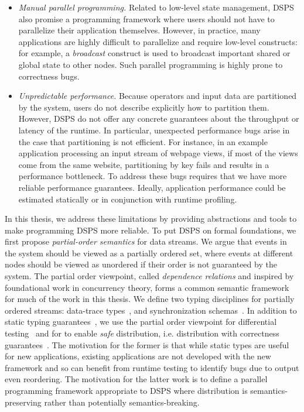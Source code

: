 \begin{itemize}
\item \emph{Manual parallel programming.}
Related to low-level state management, DSPS also promise a programming framework
where users should not have to parallelize their application themselves.
However, in practice, many applications are highly difficult to parallelize and require low-level constructs: for example, a \emph{broadcast} construct is used to broadcast important shared or global state to other nodes.
Such parallel programming is highly prone to correctness bugs.

\item \emph{Unpredictable performance.}
Because operators and input data are partitioned by the system, users
do not describe explicitly how to partition them.
However, DSPS do not offer any concrete guarantees about the throughput or latency of the runtime.
In particular, unexpected performance bugs arise in the
case that partitioning is not efficient.
For instance, in an example application processing
an input stream of webpage views, if most of the views come from the same website,
partitioning by key fails and results in a performance bottleneck.
To address these bugs requires that we have more reliable performance guarantees.
Ideally, application performance could be estimated statically or in conjunction with runtime profiling.
\end{itemize}

In this thesis, we address these limitations by providing abstractions and tools to make programming DSPS more reliable.
To put DSPS on formal foundations, we first propose \emph{partial-order semantics} for data streams.
We argue that events in the system should be viewed as a partially ordered set,
where events at different nodes should be viewed as unordered if their order
is not guaranteed by the system.
The partial order viewpoint, called \emph{dependence relations} and inspired by foundational work in concurrency theory,
forms a common semantic framework for much of the work in this thesis.
We define two typing disciplines for partially ordered streams:
data-trace types~,
and synchronization schemas~.
In addition to static typing guarantees~,
we use the partial order viewpoint for differential testing~
and for to enable \emph{safe} distribution, i.e. distribution with correctness guarantees~.
The motivation for the former is that while static types are useful
for new applications, existing applications are not developed with the new
framework and so can benefit from runtime testing to identify bugs due to
output even reordering.
The motivation for the latter work is to define a parallel programming framework appropriate to DSPS where distribution is semantics-preserving
rather than potentially semantics-breaking.

